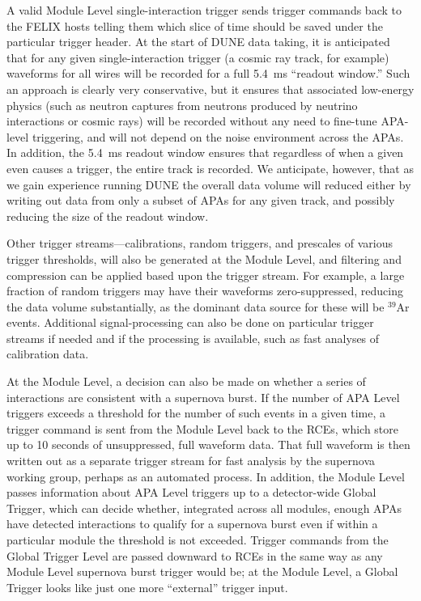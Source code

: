 	A valid Module Level single-interaction trigger sends trigger commands
back to the FELIX hosts telling them which slice of time should be saved under
the particular trigger header.  At the start of DUNE data taking, it is
anticipated that for any given single-interaction trigger (a cosmic ray track,
for example) waveforms for all wires will be recorded for a full 5.4~ms
``readout window.'' Such an approach is clearly very conservative, but it
ensures that associated low-energy physics (such as neutron captures from
neutrons produced by neutrino interactions or cosmic rays) will be recorded
without any need to fine-tune APA-level triggering, and will not depend on
the noise environment across the APAs. In addition, the 5.4~ms readout window
ensures that regardless of when a given even causes a trigger, the entire track
is recorded.  We anticipate, however, that as we gain experience running DUNE
the overall data volume will reduced either by writing out data from only a
subset of APAs for any given track, and possibly reducing the size of the
readout window.

	Other trigger streams---calibrations, random triggers, and prescales of
various trigger thresholds, will also be generated at the Module Level, and
filtering and compression can be applied based upon the trigger stream. For
example, a large fraction of random triggers may have their waveforms
zero-suppressed, reducing the data volume substantially, as the dominant data
source for these will be $^{39}$Ar events. Additional signal-processing can
also be done on particular trigger streams if needed and if the processing is
available, such as fast analyses of calibration data.

       At the Module Level, a decision can also be made on whether a series of
interactions are consistent with a supernova burst.  If the number of APA Level
triggers exceeds a threshold for the number of such events in a given time, a
trigger command is sent from the Module Level back to the RCEs, which store up
to 10 seconds of unsuppressed, full waveform data.  That full waveform is then
written out as a separate trigger stream for fast analysis by the supernova
working group, perhaps as an automated process.  In addition, the Module Level
passes information about APA Level triggers up to a detector-wide Global
Trigger, which can decide whether, integrated across all modules, enough APAs
have detected interactions to qualify for a supernova burst even if within a
particular module the threshold is not exceeded. Trigger commands from the
Global Trigger Level are passed downward to RCEs in the same way as any Module
Level supernova burst trigger would be; at the Module Level, a Global Trigger
looks like just one more ``external'' trigger input.


